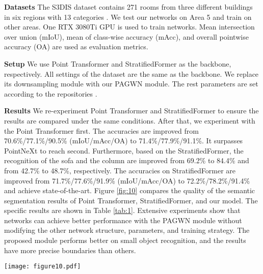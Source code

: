 \documentclass[10pt,twocolumn,letterpaper]{article}
\begin{document}
        \textbf{Datasets}  The S3DIS dataset contains 271 rooms from three different buildings in six regions with 13 categories \cite{48Armeni_2016}. We test our networks on Area 5 and train on other areas. One RTX 3080Ti GPU is used to train networks. Mean intersection over union (mIoU), mean of class-wise accuracy (mAcc), and overall pointwise accuracy (OA) are used as evaluation metrics.

        \textbf{Setup}  We use Point Transformer and StratifiedFormer as the backbone, respectively. All settings of the dataset are the same as the backbone. We replace its downsampling module with our PAGWN module. The rest parameters are set according to the repositories \cite{46,47}.

        \textbf{Results}  We re-experiment Point Transformer and StratifiedFormer to ensure the results are compared under the same conditions.
        After that, we experiment with the Point Transformer first.
        The accuracies are improved from 70.6\%/77.1\%/90.5\% (mIoU/mAcc/OA) to 71.4\%/77.9\%/91.1\%.
        It surpasses PointNeXt \cite{45https://doi.org/10.48550/arxiv.2206.04670} to reach second.
        Furthermore, based on the StratifiedFormer, the recognition of the sofa and the column are improved from 69.2\% to 84.4\% and from 42.7\% to 48.7\%, respectively.
        The accuracies on StratifiedFormer are improved from 71.7\%/77.6\%/91.9\% (mIoU/mAcc/OA) to 72.2\%/78.2\%/91.4\% and achieve state-of-the-art.
        Figure \ref{fig:10} compares the quality of the semantic segmentation results of Point Transformer, StratifiedFormer, and our model.
        The specific results are shown in Table \ref{tab:1}.
        Extensive experiments show that networks can achieve better performance with the PAGWN module without modifying the other network structure, parameters, and training strategy.
        The proposed module performs better on small object recognition, and the results have more precise boundaries than others.
        \begin{figure*}[!htb]
            \centering
            \texttt{[image: figure10.pdf]}
            \caption{Quality comparison on three different scenes of S3DIS (Area 5). There are thirteen different kinds of categories colorized by different colors. We use black boxes to highlight where our model is better than the original. The proposed module performs better on small object recognition, and the results have more precise boundaries than others. Only our proposed module can locate the clock, cabinet, and bookcase in all tested networks. (a) Point clouds with coordinates and RGB features. (b) Ground truth Semantic labels. (c) Point Transformer. (d) Point Transformer with PAGWN. (e) StratifiedFormer. (f) StratifiedFormer with PAGWN.}
            \label{fig:10}
            \end{figure*}
\end{document}
